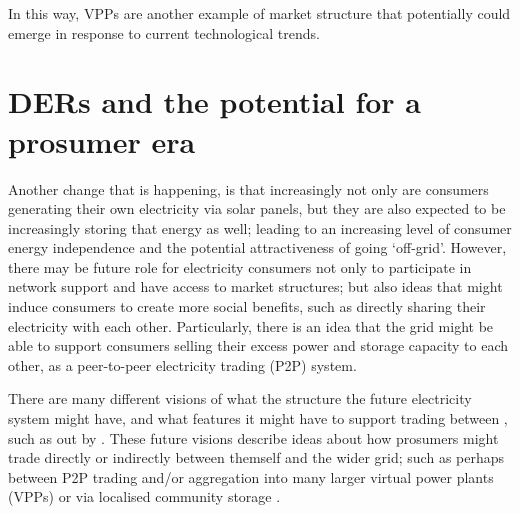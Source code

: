 
\DIFdelend In this way, VPPs are another example of market structure that potentially could emerge in response to current technological trends.

\DIFaddbegin 



\DIFaddend \section{DERs and the potential for a prosumer era}

Another change that is happening, is that increasingly not only are consumers generating their own electricity via solar panels, but they are also expected to be increasingly storing that energy as well; leading to an increasing level of consumer energy independence and the potential attractiveness of going `off-grid'.
However, there may be future role for electricity consumers \DIFdelbegin {}\DIFdelend not only to participate in network support and have access to market structures; but also ideas that might induce consumers to create more social benefits, such as directly sharing their electricity with each other.
Particularly, there is an idea that the grid might be able to support consumers selling their excess power and storage capacity to each other, as a peer-to-peer electricity trading (P2P) system.

There are many different visions of what the structure the future electricity system might have, and what features it might have to support trading between \DIFdelbegin {}\DIFdelend \DIFaddbegin {}\DIFaddend , such as \DIFdelbegin {}\DIFdelend \DIFaddbegin {}\DIFaddend out by \cite{Parag2016}.
These future visions describe ideas about how prosumers might trade directly or indirectly between themself and the wider grid; such as perhaps between P2P trading and/or aggregation into many larger virtual power plants (VPPs) or via localised community storage \cite{Morstyn2018}.

